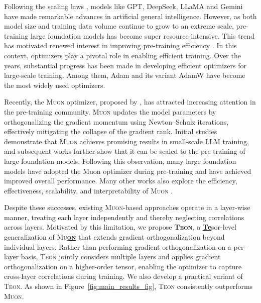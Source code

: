 \documentclass{article}
\theoremstyle{plain}
\theoremstyle{definition}
\theoremstyle{remark}
\begin{document}
Following the scaling laws \cite{kaplan2020scaling, hoffmann2022training, kumar2025scaling}, models like GPT, DeepSeek, LLaMA and Gemini~\cite{achiam2023gpt,liu2024deepseek, grattafiori2024llama, team2023gemini} have made remarkable advances in artificial general intelligence. 
However, as both model size and training data volume continue to grow to an extreme scale, pre-training large foundation models has become super resource-intensive. This trend has motivated renewed interest in improving pre-training efficiency \cite{mehmood2023efficient, han2024sltrain, you2019large, zhao2024galore, zhang2025lax,liu2025cola}. In this context, optimizers play a pivotal role in enabling efficient training. Over the years, substantial progress has been made \cite{kingma2014adam, loshchilov2017decoupled,liu2024sophia,jordan2024muon,yuan2024mars,vyas2025soap,Li_2018,li2018preconditionermatrixliegroup,pooladzandi2024curvatureinformedsgdgeneralpurpose,li2022blackboxliegroup,li2024stochastichessianfittingslie,pethick2025trainingdeeplearningmodels} in developing efficient optimizers for large-scale training. Among them, Adam \cite{kingma2014adam} and its variant AdamW \cite{loshchilov2017decoupled} have become the most widely used optimizers. 

Recently, the \textsc{Muon} optimizer, proposed by \cite{jordan2024muon}, has attracted increasing attention in the pre-training community. \textsc{Muon} updates the model parameters by orthogonalizing the gradient momentum using Newton–Schulz iterations, effectively mitigating the collapse of the gradient rank. Initial studies demonstrate that \textsc{Muon} achieves promising results in small-scale LLM training, and subsequent works \cite{liu2025muon} further show that it can be scaled to the pre-training of large foundation models. Following this observation, many large foundation models \cite{team2025kimi,ding2025kimi,zeng2025glm,team2025kimivl} have adopted the Muon optimizer during pre-training and have achieved improved overall performance. Many other works also explore the efficiency, effectiveness, scalability, and interpretability of \textsc{Muon} \cite{bernstein2025deriving,khaled2025muonbp,amsel2025polar,li2025normuon,kovalev2025understanding}.  

Despite these successes, existing \textsc{Muon}-based approaches operate in a layer-wise manner, treating each layer independently and thereby neglecting correlations across layers. Motivated by this limitation, we propose \textbf{\textsc{Teon}}, a \underline{\textbf{Te}}sor-level generalization of \textsc{Mu\underline{\textbf{on}}} that extends gradient orthogonalization beyond individual layers. Rather than performing gradient orthogonalization on a per-layer basis, \textsc{Teon} jointly considers multiple layers and applies gradient orthogonalization on a higher-order tensor, enabling the optimizer to capture cross-layer correlations during training. We also develop a practical variant of \textsc{Teon}. As shown in Figure~\ref{fig:main_results_fig}, {\textsc{Teon} consistently outperforms \textsc{Muon}}.
\end{document}
